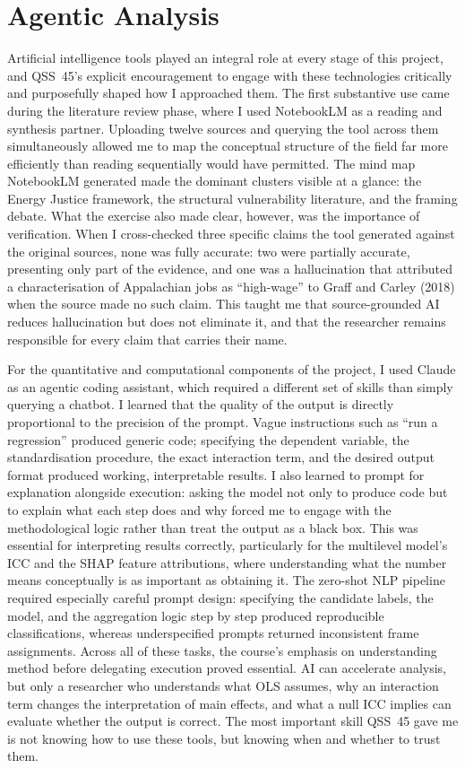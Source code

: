 \documentclass[9pt,twoside]{pnas-new}
\begin{document}
\section*{Agentic Analysis}

Artificial intelligence tools played an integral role at every stage of this
project, and QSS~45's explicit encouragement to engage with these technologies
critically and purposefully shaped how I approached them. The first substantive
use came during the literature review phase, where I used NotebookLM as a
reading and synthesis partner. Uploading twelve sources and querying the tool
across them simultaneously allowed me to map the conceptual structure of the
field far more efficiently than reading sequentially would have permitted. The
mind map NotebookLM generated made the dominant clusters visible at a glance:
the Energy Justice framework, the structural vulnerability literature, and the
framing debate. What the exercise also made clear, however, was the importance
of verification. When I cross-checked three specific claims the tool generated
against the original sources, none was fully accurate: two were partially
accurate, presenting only part of the evidence, and one was a hallucination
that attributed a characterisation of Appalachian jobs as ``high-wage'' to
Graff and Carley (2018) when the source made no such claim. This taught me
that source-grounded AI reduces hallucination but does not eliminate it, and
that the researcher remains responsible for every claim that carries their name.

For the quantitative and computational components of the project, I used
Claude as an agentic coding assistant, which required a different set of skills
than simply querying a chatbot. I learned that the quality of the output
is directly proportional to the precision of the prompt. Vague instructions
such as ``run a regression'' produced generic code; specifying the dependent
variable, the standardisation procedure, the exact interaction term, and the
desired output format produced working, interpretable results. I also learned
to prompt for explanation alongside execution: asking the model not only to
produce code but to explain what each step does and why forced me to engage
with the methodological logic rather than treat the output as a black box.
This was essential for interpreting results correctly, particularly for the
multilevel model's ICC and the SHAP feature attributions, where understanding
what the number means conceptually is as important as obtaining it. The
zero-shot NLP pipeline required especially careful prompt design: specifying
the candidate labels, the model, and the aggregation logic step by step
produced reproducible classifications, whereas underspecified prompts returned
inconsistent frame assignments. Across all of these tasks, the course's
emphasis on understanding method before delegating execution proved essential.
AI can accelerate analysis, but only a researcher who understands what OLS
assumes, why an interaction term changes the interpretation of main effects,
and what a null ICC implies can evaluate whether the output is correct.
The most important skill QSS~45 gave me is not knowing how to use these tools,
but knowing when and whether to trust them.
\end{document}
